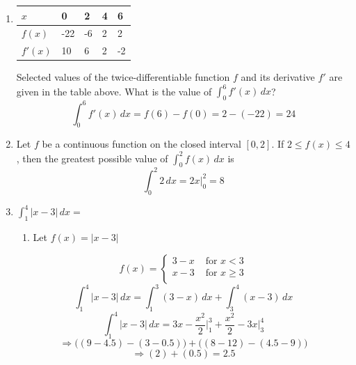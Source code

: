 \documentclass[12pt]{article}
\begin{document}
\begin{enumerate}
\item 
\begin{table}[H]
\centering
\begin{tabular}{|l||l|l|l|l|}
\hline
$x$ & 0 & 2 & 4 & 6 \\ \hline\hline
$f(x)$ & -22 & -6 & 2 & 2 \\ \hline
$f'(x)$ & 10 & 6 & 2 & -2 \\ \hline
\end{tabular}
\end{table}
Selected values of the twice-differentiable function $f$ and its derivative $f'$ are given in the table above. What is the value of $\int_{0}^{6} f'(x) \, dx$?
$$\int_{0}^{6} f'(x) \, dx = f(6)-f(0)=2-(-22)= \boxed{24}$$
\item Let $f$ be a continuous function on the closed interval $[0,2]$. If $2\leq f(x)\leq4$, then the greatest possible value of $\int_{0}^{2} f(x) \, dx$ is
$$\int_{0}^{2} 2 \, dx  = 2x\biggr\rvert_{0}^{2}=\boxed{8}$$
\item $\int_{1}^{4} |x-3| \, dx = $
\begin{enumerate}
    \item Let $f(x)=|x-3|$
\end{enumerate}
$$f(x)=\left\{
\begin{array}{ll}
     3-x & \text{ for } x < 3 \\
      x-3 & \text{ for } x \geq 3 \\
\end{array} \right.$$
$$\int_{1}^{4} |x-3| \, dx = \int_{1}^{3} (3-x) \, dx + \int_{3}^{4} (x-3) \, dx $$
$$\int_{1}^{4} |x-3| \, dx = 3x-\frac{x^2}{2} \biggr\rvert_{1}^{3} + \frac{x^2}{2}-3x \biggr\rvert_{3}^{4}  $$
$$\Longrightarrow \biggr((9-4.5)-(3-0.5) \biggr) + \biggr((8-12)-(4.5-9) \biggr) $$
$$\Longrightarrow (2)+(0.5)=\boxed{2.5}$$

\end{enumerate}
\end{document}
